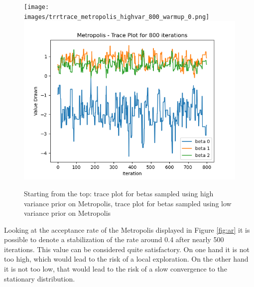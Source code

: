\documentclass{article}
\begin{document}
\begin{figure}[htp]
    \centering
    \texttt{[image: images/trrtrace\_metropolis\_highvar\_800\_warmup\_0.png]}
    \includegraphics[scale=0.6]{images/trace_metropolis_lowvar_800_warmup_0.png}
    \caption{Starting from the top: trace plot for betas sampled using high variance prior on Metropolis, trace plot for betas sampled using low variance prior on Metropolis}
    \label{fig:trace_2}
\end{figure}


Looking at the acceptance rate of the Metropolis displayed in Figure \ref{fig:ar} it is possible to denote a stabilization of the rate around 0.4 after nearly 500 iterations. This value can be considered quite satisfactory. On one hand it is not too high, which would lead to the risk of a local exploration. On the other hand it is not too low, that would lead to the risk of a slow convergence to the stationary distribution.
\end{document}
